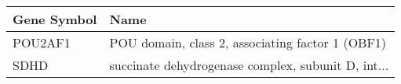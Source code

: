\begin{tabular}{ll}
\toprule
Gene Symbol &                                               Name \\
\midrule
    POU2AF1 &   POU domain, class 2, associating factor 1 (OBF1) \\
       SDHD & succinate dehydrogenase complex, subunit D, int... \\
\bottomrule
\end{tabular}
